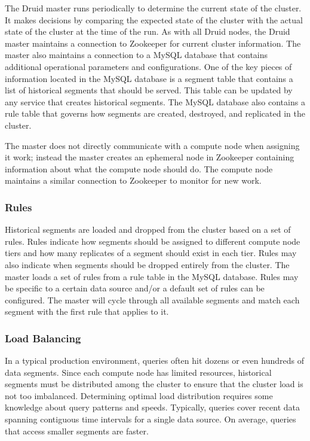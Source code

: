 \documentclass{vldb}
\begin{document}
The Druid master runs periodically to determine the current state of
the cluster. It makes decisions by comparing the expected state of the
cluster with the actual state of the cluster at the time of the
run. As with all Druid nodes, the Druid master maintains a connection
to Zookeeper for current cluster information. The master also
maintains a connection to a MySQL database that contains additional
operational parameters and configurations. One of the key pieces of
information located in the MySQL database is a segment table that
contains a list of historical segments that should be served. This
table can be updated by any service that creates historical
segments. The MySQL database also contains a rule table that governs
how segments are created, destroyed, and replicated in the cluster.

The master does not directly communicate with a compute node when
assigning it work; instead the master creates an ephemeral node in
Zookeeper containing information about what the compute node should
do. The compute node maintains a similar connection to Zookeeper to
monitor for new work.

\subsubsection{Rules}
Historical segments are loaded and dropped from the cluster based on a
set of rules. Rules indicate how segments should be assigned to
different compute node tiers and how many replicates of a segment
should exist in each tier. Rules may also indicate when segments
should be dropped entirely from the cluster. The master loads a set of
rules from a rule table in the MySQL database. Rules may be specific
to a certain data source and/or a default set of rules can be
configured. The master will cycle through all available segments and
match each segment with the first rule that applies to it.

\subsubsection{Load Balancing}
In a typical production environment, queries often hit dozens or even
hundreds of data segments. Since each compute node has limited
resources, historical segments must be distributed among the cluster
to ensure that the cluster load is not too imbalanced. Determining
optimal load distribution requires some knowledge about query patterns
and speeds. Typically, queries cover recent data spanning contiguous
time intervals for a single data source.  On average, queries that
access smaller segments are faster.
\end{document}
